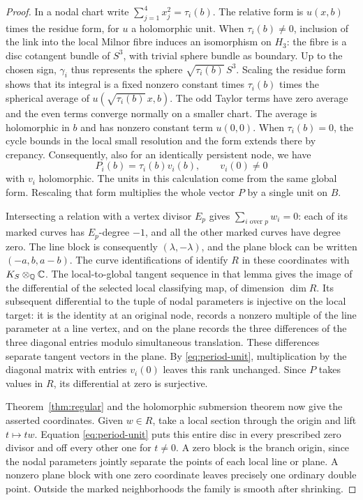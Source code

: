 \begin{proof}
In a nodal chart write $\sum_{j=1}^4 x_j^2=\tau_i(b)$. The relative
form is $u(x,b)$ times the residue form, for $u$ a holomorphic unit.
When $\tau_i(b)\ne0$, inclusion of the link into the local Milnor
fibre induces an isomorphism on $H_3$: the fibre is a disc cotangent
bundle of $S^3$, with trivial sphere bundle as boundary. Up to the
chosen sign, $\gamma_i$ thus represents the sphere
$\sqrt{\tau_i(b)}\,S^3$. Scaling the residue form shows that its
integral is a fixed nonzero constant times $\tau_i(b)$ times the
spherical average of $u(\sqrt{\tau_i(b)}\,x,b)$. The odd Taylor
terms have zero average and the even terms converge normally on
a smaller chart. The average is holomorphic in $b$ and has nonzero
constant term $u(0,0)$. When $\tau_i(b)=0$, the cycle bounds in
the local small resolution and the form extends there by crepancy.
Consequently, also for an identically persistent node, we have
\begin{equation}\label{eq:period-unit}
               P_i(b)=\tau_i(b)v_i(b),\qquad v_i(0)\ne0
\end{equation}
with $v_i$ holomorphic. The units in this calculation come from the
same global form. Rescaling that form multiplies the whole vector
$P$ by a single unit on $B$.

Intersecting a relation with a vertex divisor $E_p$ gives
$\sum_{i\text{ over }p}w_i=0$: each of its marked curves has
$E_p$-degree $-1$, and all the other marked curves have degree zero.
The line block is consequently $(\lambda,-\lambda)$, and the plane
block can be written $(-a,b,a-b)$. The curve identifications of
\cite[Proposition~3.7 and Lemma~4.4]{W5} identify $R$ in these
coordinates with $K_S\otimes_{\mathbb Q}\mathbb C$. The local-to-global
tangent sequence in that lemma gives the image of the differential
of the selected local classifying map, of dimension $\dim R$.
Its subsequent differential to the tuple of nodal parameters is
injective on the local target: it is the identity at an original
node, records a nonzero multiple of the line parameter at a line
vertex, and on the plane records the three differences of the three
diagonal entries modulo simultaneous translation. These differences
separate tangent vectors in the plane. By \eqref{eq:period-unit},
multiplication by the diagonal matrix with entries $v_i(0)$ leaves
this rank unchanged. Since $P$ takes values in $R$, its differential
at zero is surjective.

Theorem~\ref{thm:regular} and the holomorphic submersion theorem
now give the asserted coordinates. Given $w\in R$, take a
local section through the origin and lift $t\mapsto tw$. Equation
\eqref{eq:period-unit} puts this entire disc in every prescribed
zero divisor and off every other one for $t\ne0$. A zero block is the
branch origin, since the nodal parameters jointly separate the
points of each local line or plane. A nonzero plane block with one
zero coordinate leaves precisely one ordinary double point. Outside
the marked neighborhoods the family is smooth after shrinking.


\end{proof}
